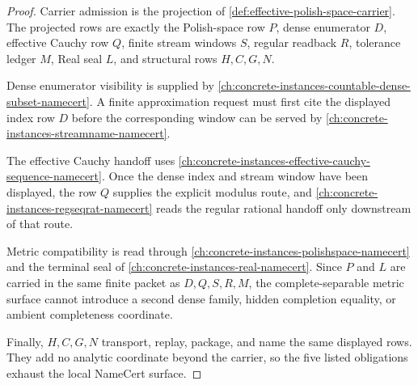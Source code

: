\begin{proof}
Carrier admission is the projection of \autoref{def:effective-polish-space-carrier}. The projected rows are exactly the Polish-space row $P$, dense enumerator $D$, effective Cauchy row $Q$, finite stream windows $S$, regular readback $R$, tolerance ledger $M$, Real seal $L$, and structural rows $H,C,G,N$.

Dense enumerator visibility is supplied by \autoref{ch:concrete-instances-countable-dense-subset-namecert}. A finite approximation request must first cite the displayed index row $D$ before the corresponding window can be served by \autoref{ch:concrete-instances-streamname-namecert}.

The effective Cauchy handoff uses \autoref{ch:concrete-instances-effective-cauchy-sequence-namecert}. Once the dense index and stream window have been displayed, the row $Q$ supplies the explicit modulus route, and \autoref{ch:concrete-instances-regseqrat-namecert} reads the regular rational handoff only downstream of that route.

Metric compatibility is read through \autoref{ch:concrete-instances-polishspace-namecert} and the terminal seal of \autoref{ch:concrete-instances-real-namecert}. Since $P$ and $L$ are carried in the same finite packet as $D,Q,S,R,M$, the complete-separable metric surface cannot introduce a second dense family, hidden completion equality, or ambient completeness coordinate.

Finally, $H,C,G,N$ transport, replay, package, and name the same displayed rows. They add no analytic coordinate beyond the carrier, so the five listed obligations exhaust the local NameCert surface.
\end{proof}

